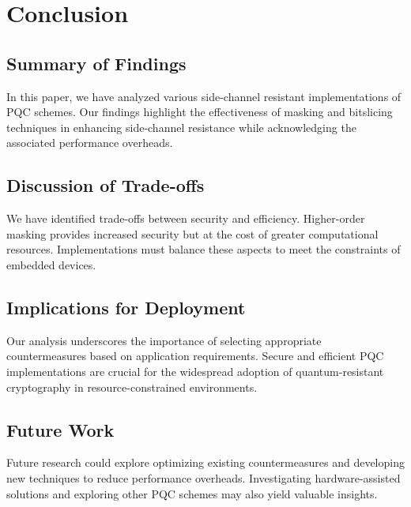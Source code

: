 \chapter{Conclusion}

\section{Summary of Findings}

In this paper, we have analyzed various side-channel resistant implementations of PQC schemes. Our findings highlight the effectiveness of masking and bitslicing techniques in enhancing side-channel resistance while acknowledging the associated performance overheads.

\section{Discussion of Trade-offs}

We have identified trade-offs between security and efficiency. Higher-order masking provides increased security but at the cost of greater computational resources. Implementations must balance these aspects to meet the constraints of embedded devices.

\section{Implications for Deployment}

Our analysis underscores the importance of selecting appropriate countermeasures based on application requirements. Secure and efficient PQC implementations are crucial for the widespread adoption of quantum-resistant cryptography in resource-constrained environments.

\section{Future Work}

Future research could explore optimizing existing countermeasures and developing new techniques to reduce performance overheads. Investigating hardware-assisted solutions and exploring other PQC schemes may also yield valuable insights.

